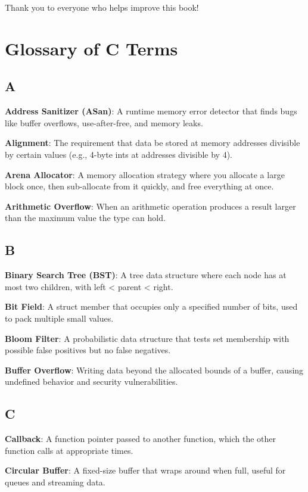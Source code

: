 \documentclass[11pt,openany]{book}
\begin{document}
Thank you to everyone who helps improve this book!

\chapter{Glossary of C Terms}

\section*{A}

\textbf{Address Sanitizer (ASan)}: A runtime memory error detector that finds bugs like buffer overflows, use-after-free, and memory leaks.

\textbf{Alignment}: The requirement that data be stored at memory addresses divisible by certain values (e.g., 4-byte ints at addresses divisible by 4).

\textbf{Arena Allocator}: A memory allocation strategy where you allocate a large block once, then sub-allocate from it quickly, and free everything at once.

\textbf{Arithmetic Overflow}: When an arithmetic operation produces a result larger than the maximum value the type can hold.

\section*{B}

\textbf{Binary Search Tree (BST)}: A tree data structure where each node has at most two children, with left < parent < right.

\textbf{Bit Field}: A struct member that occupies only a specified number of bits, used to pack multiple small values.

\textbf{Bloom Filter}: A probabilistic data structure that tests set membership with possible false positives but no false negatives.

\textbf{Buffer Overflow}: Writing data beyond the allocated bounds of a buffer, causing undefined behavior and security vulnerabilities.

\section*{C}

\textbf{Callback}: A function pointer passed to another function, which the other function calls at appropriate times.

\textbf{Circular Buffer}: A fixed-size buffer that wraps around when full, useful for queues and streaming data.
\end{document}
